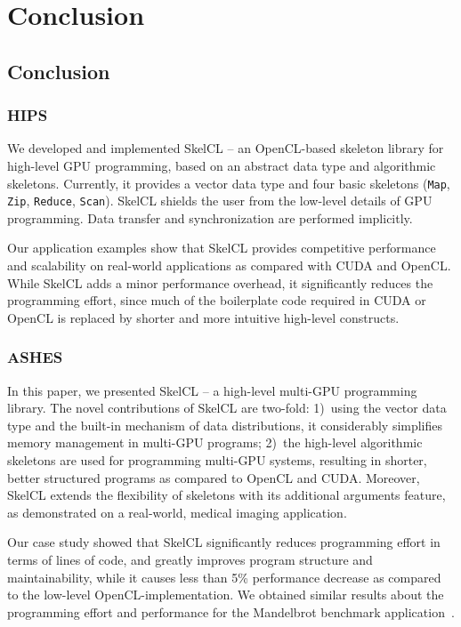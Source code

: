 
\chapter{Conclusion}

\label{ch:eighth} %

\section{Conclusion}

\subsection{HIPS}
We developed and implemented SkelCL -- an OpenCL-based skeleton library for high-level GPU programming, based on an abstract data type and algorithmic skeletons.
Currently, it provides a vector data type and four basic skeletons (\texttt{Map}, \texttt{Zip}, \texttt{Reduce}, \texttt{Scan}).
SkelCL shields the user from the low-level details of GPU programming.
Data transfer and synchronization are performed implicitly.

Our application examples show that SkelCL provides competitive performance and scalability on real-world applications as compared with CUDA and OpenCL.
While SkelCL adds a minor performance overhead, it significantly reduces the programming effort, since much of the boilerplate code required in CUDA or OpenCL is replaced by shorter and more intuitive high-level constructs.

\subsection{ASHES}
In this paper, we presented SkelCL -- a high-level multi-GPU programming library.
The novel contributions of SkelCL are two-fold:
1)~using the vector data type and the built-in mechanism of data distributions, it considerably simplifies memory management in multi-GPU programs;
2)~the high-level algorithmic skeletons are used for programming multi-GPU systems, resulting in shorter, better structured programs as compared to OpenCL and CUDA.
Moreover, SkelCL extends the flexibility of skeletons with its additional arguments feature, as demonstrated on a real-world, medical imaging application.

Our case study showed that SkelCL significantly reduces programming effort in terms of lines of code, and greatly improves program structure and maintainability, while it causes less than 5\% performance decrease as compared to the low-level OpenCL-implementation.
We obtained similar results about the programming effort and performance for the Mandelbrot benchmark application~\cite{SteuwerKeGo2011}.

